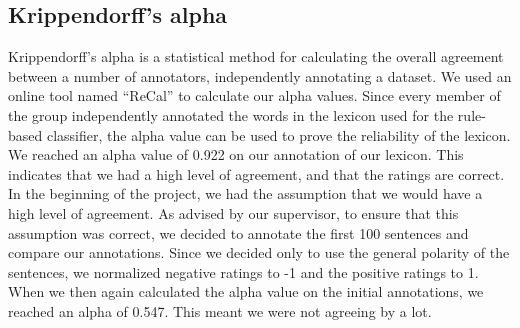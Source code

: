 \subsection{Krippendorff’s alpha}
Krippendorff’s alpha is a statistical method for calculating the overall agreement between a number of annotators, independently annotating a dataset. 
We used an online tool named “ReCal” \cite{ReCal} to calculate our alpha values.
Since every member of the group independently annotated the words in the lexicon used for the rule-based classifier, the alpha value can be used to prove the reliability of the lexicon.
We reached an alpha value of 0.922 on our annotation of our lexicon. This indicates that we had a high level of agreement, and that the ratings are correct.
In the beginning of the project, we had the assumption that we would have a high level of agreement. As advised by our supervisor, to ensure that this assumption was correct, we decided to annotate the first 100 sentences and compare our annotations.
Since we decided only to use the general polarity of the sentences, we normalized negative ratings to -1 and the positive ratings to 1. 
When we then again calculated the alpha value on the initial annotations, we reached an alpha of 0.547. This meant we were not agreeing by a lot. 

